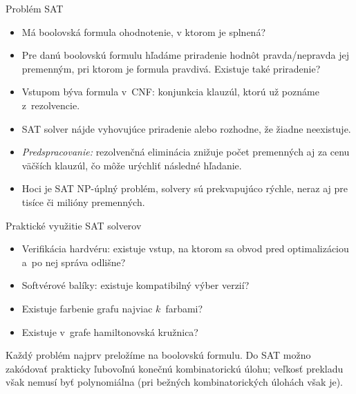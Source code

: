 \documentclass[12pt]{beamer}
\begin{document}
\begin{frame}{Problém SAT}
  \begin{itemize}
    \item \alert{Má boolovská formula ohodnotenie, v ktorom je splnená?}
    \item Pre danú boolovskú formulu hľadáme priradenie hodnôt
      pravda/nepravda jej premenným, pri ktorom je formula pravdivá.
      Existuje také priradenie?
    \item Vstupom býva formula v~CNF: konjunkcia klauzúl,
      ktorú už poznáme z~rezolvencie.
    \item SAT solver nájde vyhovujúce priradenie alebo rozhodne,
      že žiadne neexistuje.
    \item \emph{Predspracovanie:} rezolvenčná eliminácia znižuje
      počet premenných aj za cenu väčších klauzúl,
      čo môže urýchliť následné hľadanie.
    \item Hoci je SAT NP-úplný problém, solvery sú prekvapujúco rýchle, neraz aj pre tisíce či milióny premenných.
  \end{itemize}
\end{frame}

\begin{frame}{Praktické využitie SAT solverov}
  \begin{itemize}
    \item Verifikácia hardvéru: existuje vstup, na ktorom sa obvod
      pred optimalizáciou a~po nej správa odlišne?
    \item Softvérové balíky: existuje kompatibilný výber verzií?
    \item Existuje farbenie grafu najviac $k$~farbami?
    \item Existuje v~grafe hamiltonovská kružnica?
  \end{itemize}
  Každý problém najprv preložíme na boolovskú formulu.
  Do SAT možno zakódovať prakticky ľubovoľnú konečnú kombinatorickú úlohu;
  veľkosť prekladu však nemusí byť polynomiálna
  (pri bežných kombinatorických úlohách však je).
\end{frame}
\end{document}
